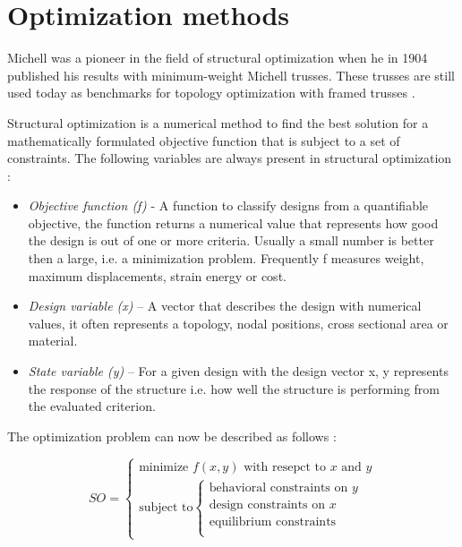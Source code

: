 \section{Optimization methods}
Michell was a pioneer in the field of structural optimization \cite{Michell1904} when he in 1904 published his results with minimum-weight Michell trusses. These trusses are still used today as benchmarks for topology optimization with framed trusses \cite{Clune2013}. 

Structural optimization is a numerical method to find the best solution for a mathematically formulated objective function that is subject to a set of constraints. The following variables are always present in structural optimization \cite{christensen2008introduction}:

\begin{itemize} 
\item \textit{Objective function (f) }- A function to classify designs from a quantifiable objective, the function returns a numerical value that represents how good the design is out of one or more criteria. Usually a small number is better then a large, i.e. a minimization problem. Frequently f measures weight, maximum displacements, strain energy or cost.
\item \textit{Design variable (x)} – A vector that describes the design with numerical values, it often represents a topology, nodal positions, cross sectional area or material.
\item \textit{State variable (y)} – For a given design with the design vector x, y represents the response of the structure i.e. how well the structure is performing from the evaluated criterion.
\end{itemize} 

The optimization problem can now be described as follows \cite{christensen2008introduction} :

\begin{equation}
SO=\begin{cases}
    \textrm{minimize } f(x,y) \textrm{ with resepct to } x \textrm{ and } y \\
    {\textrm{subject to} \begin{cases}
        \textrm{behavioral constraints on } y\\
        \textrm{design constraints on } x\\
	\textrm{equilibrium constraints} \\
    \end{cases}}
      \end{cases}
    \end{equation} 


